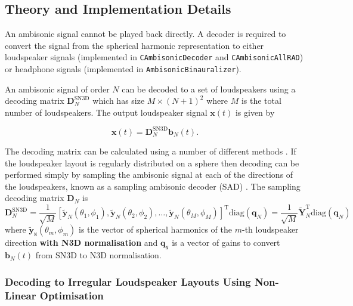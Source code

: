 \documentclass[12pt]{report}
\newcommand{\code}[1]{\texttt{#1}}
\begin{document}
\subsection{Theory and Implementation Details}
An ambisonic signal cannot be played back directly.
A decoder is required to convert the signal from the spherical harmonic representation to either loudspeaker signals (implemented in \code{CAmbisonicDecoder} and \code{CAmbisonicAllRAD}) or headphone signals (implemented in \code{AmbisonicBinauralizer}).

An ambisonic signal of order $N$ can be decoded to a set of loudspeakers using a decoding matrix $\textbf{D}_{N}^{\mathrm{SN3D}}$ which has size $M \times (N+1)^2$ where $M$ is the total number of loudspeakers. The output loudspeaker signal $\textbf{x}(t)$ is given by

\begin{equation}\label{eqn:decode}
\textbf{x}(t) = \textbf{D}_{N}^{\mathrm{SN3D}} \textbf{b}_{N}(t).
\end{equation}

The decoding matrix can be calculated using a number of different methods \cite{Zotter2012, Zotter2012a, Poletti2005}. If the loudspeaker layout is regularly distributed on a sphere then decoding can be performed simply by sampling the ambisonic signal at each of the directions of the loudspeakers, known as a sampling ambisonic decoder (SAD) \cite{Zotter2019}.
The sampling decoding matrix $\textbf{D}_{N}$ is
\begin{equation}
    \textbf{D}_{N}^{\mathrm{SN3D}} = \frac{1}{\sqrt{M}} \left[ \tilde{\textbf{y}}_{N}(\theta_{1}, \phi_{1}), \tilde{\textbf{y}}_{N}(\theta_{2}, \phi_{2}), \ldots, \tilde{\textbf{y}}_{N}(\theta_{M}, \phi_{M}) \right]^{\mathrm{T}}\mathrm{diag}(\textbf{q}_{N}) = \frac{1}{\sqrt{M}} \tilde{\textbf{Y}}_{N}^{\mathrm{T}}\mathrm{diag}(\textbf{q}_{N})
\end{equation}
where $\tilde{\textbf{y}}_{\texttt{N}}(\theta_{m}, \phi_{m})$ is the vector of spherical harmonics of the $m$-th loudspeaker direction \textbf{with N3D normalisation} and $\textbf{q}_{\texttt{N}}$ is a vector of gains to convert $\textbf{b}_{N}(t)$ from SN3D to N3D normalisation.

\subsubsection{Decoding to Irregular Loudspeaker Layouts Using Non-Linear Optimisation}\label{AmbiIrregularDecoder}
\end{document}
